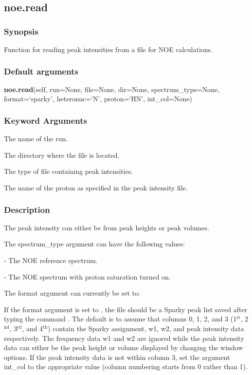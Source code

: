 \newpage

\subsection{noe.read}


\subsubsection{Synopsis}

Function for reading peak intensities from a file for NOE calculations.

\subsubsection{Default arguments}

\textsf{\textbf{noe.read}(self, run=None, file=None, dir=None, spectrum\_type=None, format=`sparky', heteronuc=`N', proton=`HN', int\_col=None)}


\subsubsection{Keyword Arguments}

  The name of the run.

  The directory where the file is located.

  The type of file containing peak intensities.

  The name of the proton as specified in the peak intensity file.


\subsubsection{Description}

The peak intensity can either be from peak heights or peak volumes.


The spectrum\_type argument can have the following values:
    
 - The NOE reference spectrum.
    
 - The NOE spectrum with proton saturation turned on.


The format argument can currently be set to:
    

    


If the format argument is set to 
, the file should be a Sparky peak list saved after
typing the command 
.  The default is to assume that columns 0, 1, 2, and 3 (1$^\mathrm{st}$, 2$^\mathrm{nd}$,
3$^\mathrm{rd}$, and 4$^\mathrm{th}$) contain the Sparky assignment, w1, w2, and peak intensity data respectively.
The frequency data w1 and w2 are ignored while the peak intensity data can either be the
peak height or volume displayed by changing the window options.  If the peak intensity data
is not within column 3, set the argument int\_col to the appropriate value (column numbering
starts from 0 rather than 1).


